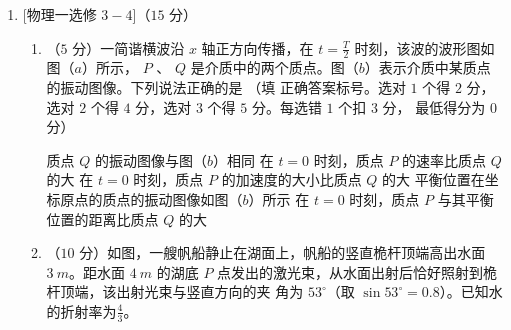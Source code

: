 \begin{enumerate}
\begin{enumerate}
\begin{enumerate}
\end{enumerate}






\end{enumerate}



\newpage
\item 

[物理一选修 $ 3-4 $]（$ 15 $ 分）


\begin{enumerate}
\renewcommand{\labelenumi}{\arabic{enumi}.}
\item
（$ 5 $ 分）一简谐横波沿 $ x $ 轴正方向传播，在 $t=\frac{T}{2}$
时刻，该波的波形图如图（$ a $）所示， $ P $ 、
$ Q $ 是介质中的两个质点。图（$ b $）表示介质中某质点的振动图像。下列说法正确的是  
（填
正确答案标号。选对 $ 1 $ 个得 $ 2 $ 分，选对 $ 2 $ 个得 $ 4 $ 分，选对 $ 3 $ 个得 $ 5 $ 分。每选错 $ 1 $ 个扣 $ 3 $ 分，
最低得分为 $ 0 $ 分）
\begin{figure}[h!]
\centering

\end{figure}



\fivechoices
{质点 $ Q $ 的振动图像与图（$ b $）相同}
{在 $ t=0 $ 时刻，质点 $ P $ 的速率比质点 $ Q $ 的大}
{在 $ t=0 $ 时刻，质点 $ P $ 的加速度的大小比质点 $ Q $ 的大}
{平衡位置在坐标原点的质点的振动图像如图（$ b $）所示}
{在 $ t=0 $ 时刻，质点 $ P $ 与其平衡位置的距离比质点 $ Q $ 的大}


\item 
（$ 10 $ 分）如图，一艘帆船静止在湖面上，帆船的竖直桅杆顶端高出水面 $ 3 \ m $。距水面 $ 4 \ m $
的湖底 $ P $ 点发出的激光束，从水面出射后恰好照射到桅杆顶端，该出射光束与竖直方向的夹
角为 $ 53 ^{ \circ } $（取 $ \sin 53 ^{ \circ } =0.8 $）。已知水的折射率为$ \frac{ 4 }{ 3 } $。




\end{enumerate}
\end{enumerate}
